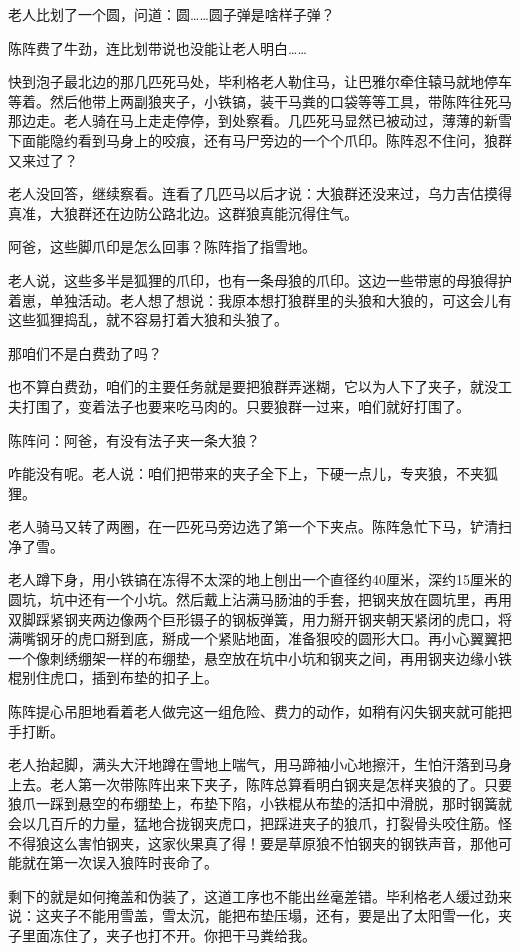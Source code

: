 \par 老人比划了一个圆，问道：圆……圆子弹是啥样子弹？
\par 陈阵费了牛劲，连比划带说也没能让老人明白……
\par 快到泡子最北边的那几匹死马处，毕利格老人勒住马，让巴雅尔牵住辕马就地停车等着。然后他带上两副狼夹子，小铁镐，装干马粪的口袋等等工具，带陈阵往死马那边走。老人骑在马上走走停停，到处察看。几匹死马显然已被动过，薄薄的新雪下面能隐约看到马身上的咬痕，还有马尸旁边的一个个爪印。陈阵忍不住问，狼群又来过了？
\par 老人没回答，继续察看。连看了几匹马以后才说：大狼群还没来过，乌力吉估摸得真准，大狼群还在边防公路北边。这群狼真能沉得住气。
\par 阿爸，这些脚爪印是怎么回事？陈阵指了指雪地。
\par 老人说，这些多半是狐狸的爪印，也有一条母狼的爪印。这边一些带崽的母狼得护着崽，单独活动。老人想了想说：我原本想打狼群里的头狼和大狼的，可这会儿有这些狐狸捣乱，就不容易打着大狼和头狼了。
\par 那咱们不是白费劲了吗？
\par 也不算白费劲，咱们的主要任务就是要把狼群弄迷糊，它以为人下了夹子，就没工夫打围了，变着法子也要来吃马肉的。只要狼群一过来，咱们就好打围了。
\par 陈阵问：阿爸，有没有法子夹一条大狼？
\par 咋能没有呢。老人说：咱们把带来的夹子全下上，下硬一点儿，专夹狼，不夹狐狸。
\par 老人骑马又转了两圈，在一匹死马旁边选了第一个下夹点。陈阵急忙下马，铲清扫净了雪。
\par 老人蹲下身，用小铁镐在冻得不太深的地上刨出一个直径约40厘米，深约15厘米的圆坑，坑中还有一个小坑。然后戴上沾满马肠油的手套，把钢夹放在圆坑里，再用双脚踩紧钢夹两边像两个巨形镊子的钢板弹簧，用力掰开钢夹朝天紧闭的虎口，将满嘴钢牙的虎口掰到底，掰成一个紧贴地面，准备狠咬的圆形大口。再小心翼翼把一个像刺绣绷架一样的布绷垫，悬空放在坑中小坑和钢夹之间，再用钢夹边缘小铁棍别住虎口，插到布垫的扣子上。
\par 陈阵提心吊胆地看着老人做完这一组危险、费力的动作，如稍有闪失钢夹就可能把手打断。
\par 老人抬起脚，满头大汗地蹲在雪地上喘气，用马蹄袖小心地擦汗，生怕汗落到马身上去。老人第一次带陈阵出来下夹子，陈阵总算看明白钢夹是怎样夹狼的了。只要狼爪一踩到悬空的布绷垫上，布垫下陷，小铁棍从布垫的活扣中滑脱，那时钢簧就会以几百斤的力量，猛地合拢钢夹虎口，把踩进夹子的狼爪，打裂骨头咬住筋。怪不得狼这么害怕钢夹，这家伙果真了得！要是草原狼不怕钢夹的钢铁声音，那他可能就在第一次误入狼阵时丧命了。
\par 剩下的就是如何掩盖和伪装了，这道工序也不能出丝毫差错。毕利格老人缓过劲来说：这夹子不能用雪盖，雪太沉，能把布垫压塌，还有，要是出了太阳雪一化，夹子里面冻住了，夹子也打不开。你把干马粪给我。
